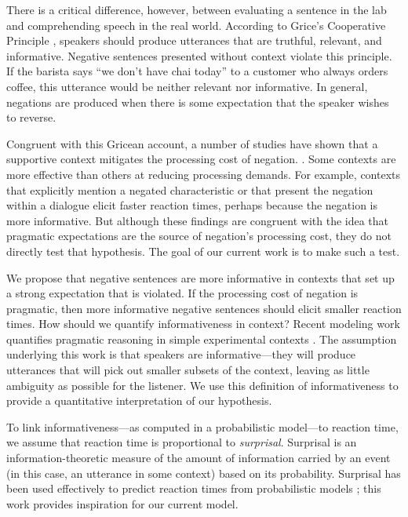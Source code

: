 \documentclass[10pt,letterpaper]{article}
\begin{document}
There is a critical difference, however, between evaluating a sentence in the lab and comprehending speech in the real world. According to Grice's Cooperative Principle \cite{grice1975}, speakers should produce utterances that are truthful, relevant, and informative.  Negative sentences presented without context violate this principle.  If the barista says ``we don't have chai today'' to a customer who always orders coffee, this utterance would be neither relevant nor informative.  In general, negations are produced when there is some expectation that the speaker wishes to reverse.  

Congruent with this Gricean account, a number of studies have shown that a supportive context mitigates the processing cost of negation.  \cite{wason1965, glenberg1999, ludtke2006, nieuwland2008, dale2011}. Some contexts are more effective than others at reducing processing demands. For example, contexts that explicitly mention a negated characteristic \cite{ludtke2006} or that present the negation within a dialogue \cite{dale2011} elicit faster reaction times, perhaps because the negation is more informative. But although these findings are congruent with the idea that pragmatic expectations are the source of negation's processing cost, they do not directly test that hypothesis.  The goal of our current work is to make such a test.

We propose that negative sentences are more informative in contexts that set up a strong expectation that is violated. If the processing cost of negation is pragmatic, then more informative negative sentences should elicit smaller reaction times. How should we quantify informativeness in context? Recent modeling work quantifies pragmatic reasoning in simple experimental contexts \cite{frank2012,goodman2013}. The assumption underlying this work is that speakers are informative---they will produce utterances that will pick out smaller subsets of the context, leaving as little ambiguity as possible for the listener.  We use this definition of informativeness to provide a quantitative interpretation of our hypothesis.

To link informativeness---as computed in a probabilistic model---to reaction time, we assume that reaction time is proportional to \emph{surprisal}. Surprisal is an information-theoretic measure of the amount of information carried by an event (in this case, an utterance in some context) based on its probability. Surprisal has been used effectively to predict reaction times from probabilistic models \cite{levy2008}; this work provides inspiration for our current model. 
\end{document}
